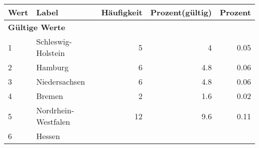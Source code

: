      \begin{longtable}{lXrrr}
     \toprule
     \textbf{Wert} & \textbf{Label} & \textbf{Häufigkeit} & \textbf{Prozent(gültig)} & \textbf{Prozent} \\
     \endhead
     \midrule
     \multicolumn{5}{l}{\textbf{Gültige Werte}}\\

     1 &
     \multicolumn{1}{X}{ Schleswig-Holstein   } &


       \num{5} &
       \num[round-mode=places,round-precision=2]{4} &
         \num[round-mode=places,round-precision=2]{0.05} \\

     2 &
     \multicolumn{1}{X}{ Hamburg   } &


       \num{6} &
       \num[round-mode=places,round-precision=2]{4.8} &
         \num[round-mode=places,round-precision=2]{0.06} \\

     3 &
     \multicolumn{1}{X}{ Niedersachsen   } &


       \num{6} &
       \num[round-mode=places,round-precision=2]{4.8} &
         \num[round-mode=places,round-precision=2]{0.06} \\

     4 &
     \multicolumn{1}{X}{ Bremen   } &


       \num{2} &
       \num[round-mode=places,round-precision=2]{1.6} &
         \num[round-mode=places,round-precision=2]{0.02} \\

     5 &
     \multicolumn{1}{X}{ Nordrhein-Westfalen   } &


       \num{12} &
       \num[round-mode=places,round-precision=2]{9.6} &
         \num[round-mode=places,round-precision=2]{0.11} \\

     6 &
     \multicolumn{1}{X}{ Hessen   } &



\end{longtable}
